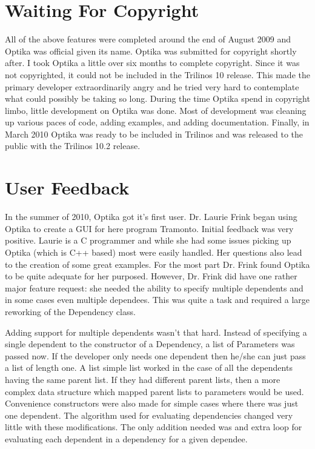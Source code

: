 \section{Waiting For Copyright}
	All of the above features were completed around the end of August 2009 and Optika was official given its name.
	Optika was submitted for copyright shortly after. I took Optika a little over six months to complete copyright.
	Since it was not copyrighted, it could not be included in the Trilinos 10 release. This made the primary developer extraordinarily
	angry and he tried very hard to contemplate what could possibly be taking so long. During the time Optika spend in copyright limbo, 
	little development on Optika was done. Most of development was cleaning up various paces of code, adding examples, and adding documentation. 
	Finally, in March 2010 Optika was ready to be included in Trilinos and was released to the public with the Trilinos 10.2 release.

\section{User Feedback}
In the summer of 2010, Optika got it's first user. Dr. Laurie Frink began using Optika to create a GUI for here program Tramonto.
Initial feedback was very positive. Laurie is a C programmer and while she had some issues picking up Optika (which is C++ based)
most were easily handled. Her questions also lead to the creation of some great examples. For the most part Dr. Frink found Optika
to be quite adequate for her purposed. However, Dr. Frink did have one rather major feature request: she needed the ability to 
specify multiple dependents and in some cases even multiple dependees. This was quite a task and required a large reworking of the
Dependency class. 

Adding support for multiple dependents wasn't that hard. Instead of specifying a single dependent to the constructor of a Dependency, a list
of Parameters was passed now. If the developer only needs one dependent then he/she can just pass a list of length one. A list simple
list worked in the case of all the dependents having the same parent list. If they had different parent lists, then a more complex 
data structure which mapped parent lists to parameters would be used. Convenience constructors were also made for simple cases where
there was just one dependent. The algorithm used for evaluating dependencies changed very little with these modifications. The only addition
needed was and extra loop for evaluating each dependent in a dependency for a given dependee.


